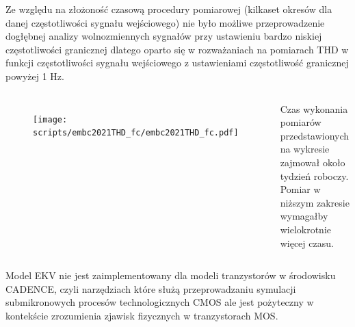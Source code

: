 \begin{frame}[t]
    \begin{block}{\tb}
    \end{block}
    Ze względu na złożoność czasową procedury pomiarowej (kilkaset okresów dla danej częstotliwości sygnału wejściowego) nie było możliwe przeprowadzenie dogłębnej analizy wolnozmiennych sygnałów przy ustawieniu bardzo niskiej częstotliwości granicznej dlatego oparto się w rozważaniach na pomiarach THD w funkcji częstotliwości sygnału wejściowego z ustawieniami częstotliwość granicznej powyżej 1 Hz.
    
    \begin{columns}

        \begin{figure}[H]
            \centering
            \texttt{[image: scripts/embc2021THD\_fc/embc2021THD\_fc.pdf]}  
        \end{figure}
    
        Czas wykonania pomiarów przedstawionych na wykresie zajmował około tydzień roboczy. Pomiar w niższym zakresie wymagałby wielokrotnie więcej czasu. 
    \end{columns}






\end{frame}
\begin{frame}[t]
    \begin{block}{\tb}
    \end{block}


    Model EKV nie jest zaimplementowany dla modeli tranzystorów w  środowisku CADENCE, czyli narzędziach które służą przeprowadzaniu symulacji submikronowych procesów technologicznych CMOS ale jest pożyteczny w kontekście zrozumienia zjawisk fizycznych w tranzystorach MOS. 
\end{frame}

